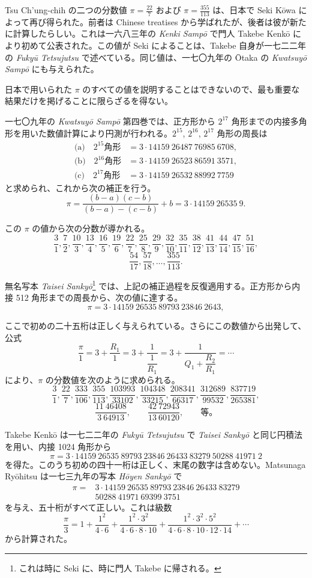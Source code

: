 \documentclass[11pt]{article}
\newcommand{\scanpage}[2]{\clearpage\setcounter{footnote}{0}\noindent{\footnotesize\color{gray}PDF #1 頁 · #2}\par\medskip}
\newcommand{\scanfooter}{}
\begin{document}
Tsu Ch'ung-chih の二つの分数値 $\pi=\frac{22}{7}$ および $\pi=\frac{355}{113}$ は、日本で Seki Kōwa によって再び得られた。前者は Chinese treatises から学ばれたが、後者は彼が新たに計算したらしい。これは一六八三年の \emph{Kenki Sampō} で門人 Takebe Kenkō により初めて公表された。この値が Seki によることは、Takebe 自身が一七二二年の \emph{Fukyū Tetsujutsu} で述べている。同じ値は、一七〇九年の Ōtaka の \emph{Kwatsuyō Sampō} にも与えられた。

日本で用いられた $\pi$ のすべての値を説明することはできないので、最も重要な結果だけを掲げることに限らざるを得ない。

一七〇九年の \emph{Kwatsuyō Sampō} 第四巻では、正方形から $2^{17}$ 角形までの内接多角形を用いた数値計算により円測が行われる。$2^{15}$, $2^{16}$, $2^{17}$ 角形の周長は
\[
\begin{aligned}
\text{(a)}\quad 2^{15}\text{角形}&=3\cdot14159\ 26487\ 76985\ 6708,\\
\text{(b)}\quad 2^{16}\text{角形}&=3\cdot14159\ 26523\ 86591\ 3571,\\
\text{(c)}\quad 2^{17}\text{角形}&=3\cdot14159\ 26532\ 88992\ 7759
\end{aligned}
\]
と求められ、これから次の補正を行う。
\[
\pi=\frac{(b-a)(c-b)}{(b-a)-(c-b)}+b=3\cdot14159\ 26535\ 9.
\]

この $\pi$ の値から次の分数が導かれる。
\[
\frac31,\frac72,\frac{10}3,\frac{13}4,\frac{16}5,\frac{19}6,\frac{22}7,\frac{25}8,
\frac{29}9,\frac{32}{10},\frac{35}{11},\frac{38}{12},\frac{41}{13},\frac{44}{14},\frac{47}{15},\frac{51}{16},
\]
\[
\frac{54}{17},\frac{57}{18},\ldots,\frac{355}{113}.
\]

無名写本 \emph{Taisei Sankyō}\footnote{これは時に Seki に、時に門人 Takebe に帰される。} では、上記の補正過程を反復適用する。正方形から内接 512 角形までの周長から、次の値に達する。
\[
\pi=3\cdot14159\ 26535\ 89793\ 23846\ 2643,
\]
\scanfooter

\scanpage{0216}{第25章、印刷頁202}
ここで初めの二十五桁は正しく与えられている。さらにこの数値から出発して、公式
\[
\frac{\pi}{1}=3+\frac{R_1}{1}=3+\frac{1}{\dfrac{1}{R_1}}=3+\frac{1}{Q_1+\dfrac{R_2}{R_1}}=\cdots
\]
により、$\pi$ の分数値を次のように求められる。
\[
\frac31,\frac{22}7,\frac{333}{106},\frac{355}{113},\frac{103993}{33102},\frac{104348}{33215},\frac{208341}{66317},\frac{312689}{99532},\frac{837719}{265381},
\]
\[
\frac{11\ 46408}{3\ 64913},\qquad \frac{42\ 72943}{13\ 60120},\qquad\text{等。}
\]

Takebe Kenkō は一七二二年の \emph{Fukyū Tetsujutsu} で \emph{Taisei Sankyō} と同じ円積法を用い、内接 1024 角形から
\[
\pi=3\cdot14159\ 26535\ 89793\ 23846\ 26433\ 83279\ 50288\ 41971\ 2
\]
を得た。このうち初めの四十一桁は正しく、末尾の数字は含めない。Matsunaga Ryōhitsu は一七三九年の写本 \emph{Hōyen Sankyō} で
\[
\begin{aligned}
\pi={}&3\cdot14159\ 26535\ 89793\ 23846\ 26433\ 83279\\
&50288\ 41971\ 69399\ 3751
\end{aligned}
\]
を与え、五十桁がすべて正しい。これは級数
\[
\frac{\pi}{3}=1+\frac{1^2}{4\cdot6}+\frac{1^2\cdot3^2}{4\cdot6\cdot8\cdot10}+\frac{1^2\cdot3^2\cdot5^2}{4\cdot6\cdot8\cdot10\cdot12\cdot14}+\cdots
\]
から計算された。
\end{document}
